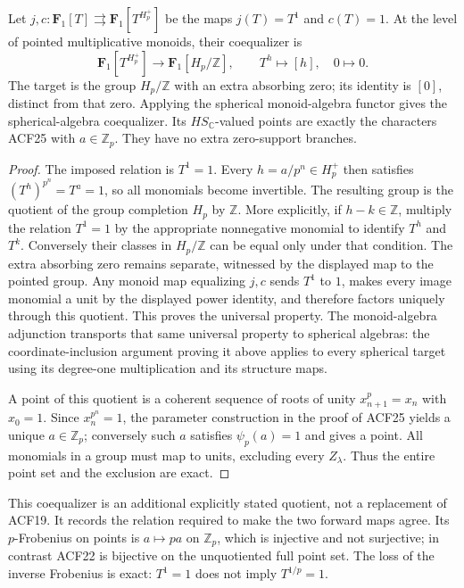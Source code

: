 \begin{proposition}
Let $j,c:\mathbf F_1[T]\rightrightarrows
\mathbf F_1[T^{H_p^+}]$ be the maps $j(T)=T^1$ and $c(T)=1$.
At the level of pointed multiplicative monoids, their coequalizer is
\begin{equation}\tag{ACF28}
 \mathbf F_1[T^{H_p^+}]\longrightarrow
 \mathbf F_1[H_p/\mathbb Z],\qquad
 T^h\longmapsto[h],\quad 0\longmapsto0.
\end{equation}
The target is the group $H_p/\mathbb Z$ with an extra absorbing zero;
its identity is $[0]$, distinct from that zero. Applying the spherical
monoid-algebra functor gives the spherical-algebra coequalizer.
Its $HS_{\mathbb C}$-valued points are exactly the characters ACF25
with $a\in\mathbb Z_p$. They have no extra zero-support branches.
\end{proposition}
\begin{proof}
The imposed relation is $T^1=1$. Every $h=a/p^n\in H_p^+$ then
satisfies $(T^h)^{p^n}=T^a=1$, so all monomials become invertible.
The resulting group is the quotient of the group completion $H_p$ by
$\mathbb Z$. More explicitly, if $h-k\in\mathbb Z$, multiply the
relation $T^1=1$ by the appropriate nonnegative monomial to identify
$T^h$ and $T^k$. Conversely their classes in $H_p/\mathbb Z$ can be
equal only under that condition. The extra absorbing zero remains
separate, witnessed by the displayed map to the pointed group.
Any monoid map equalizing $j,c$ sends $T^1$ to $1$, makes every image
monomial a unit by the displayed power identity, and therefore factors
uniquely through this quotient. This proves the universal property.
The monoid-algebra adjunction transports that same universal property
to spherical algebras: the coordinate-inclusion argument proving it
above applies to every spherical target using its degree-one
multiplication and its structure maps.

A point of this quotient is a coherent sequence of roots of unity
$x_{n+1}^p=x_n$ with $x_0=1$. Since $x_n^{p^n}=1$, the parameter
construction in the proof of ACF25 yields a unique $a\in\mathbb Z_p$;
conversely such $a$ satisfies $\psi_p(a)=1$ and gives a point.
All monomials in a group must map to units, excluding every
$Z_\lambda$. Thus the entire point set and the exclusion are exact.
\end{proof}
This coequalizer is an additional explicitly stated quotient, not a
replacement of ACF19. It records the relation required to make the two
forward maps agree. Its $p$-Frobenius on points is $a\mapsto pa$ on
$\mathbb Z_p$, which is injective and not surjective; in contrast
ACF22 is bijective on the unquotiented full point set. The loss of the
inverse Frobenius is exact: $T^1=1$ does not imply $T^{1/p}=1$.

